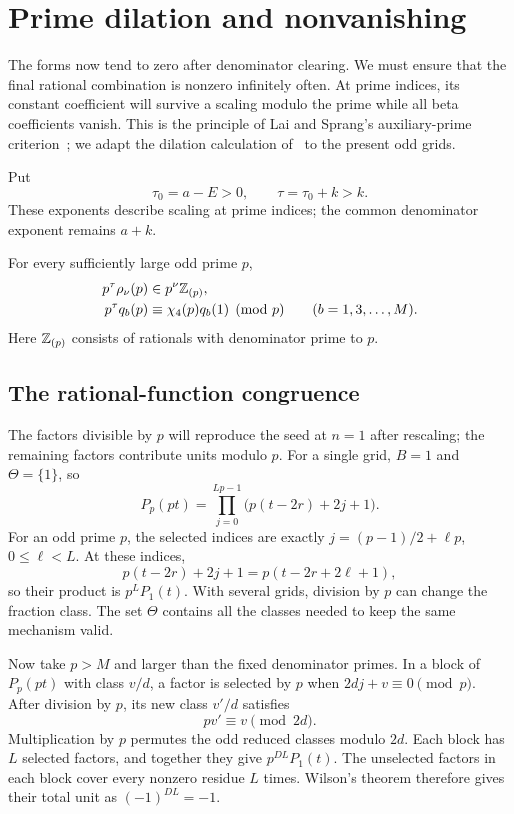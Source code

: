 \section{Prime dilation and nonvanishing}\label{sec:dilation}

The forms now tend to zero after denominator clearing. We must
ensure that the final rational combination is nonzero infinitely
often. At prime indices, its constant coefficient will survive
a scaling modulo the prime while all beta coefficients vanish.
This is the principle of Lai and Sprang's auxiliary-prime
criterion~\cite[Lemma~2.3]{LS25}; we adapt the dilation calculation
of~\cite[Section~6]{Tcount} to the present odd grids.

Put
\[
 \tau_0=a-E>0,\qquad \tau=\tau_0+k>k.
\]
These exponents describe scaling at prime indices; the common
denominator exponent remains $a+k$.

\begin{proposition}\label{prop:dilation}
For every sufficiently large odd prime $p$,
\begin{align}
 p^\tau\rho_\nu(p)&\in p^\nu\mathbb Z_{(p)},\label{eq:rho-dilation}\\
 p^\tau q_b(p)&\equiv\chi_4(p)q_b(1)\pmod p
                    \qquad(b=1,3,\ldots,M).\label{eq:q-dilation}
\end{align}
Here $\mathbb Z_{(p)}$ consists of rationals with denominator prime to $p$.
\end{proposition}

\subsection{The rational-function congruence}

The factors divisible by $p$ will reproduce the seed at $n=1$
after rescaling; the remaining factors contribute units modulo $p$.
For a single grid, $B=1$ and $\Theta=\{1\}$, so
\[
 P_p(pt)=\prod_{j=0}^{Lp-1}\bigl(p(t-2r)+2j+1\bigr).
\]
For an odd prime $p$, the selected indices are exactly
$j=(p-1)/2+\ell p$, $0\le\ell<L$. At these indices,
\[
 p(t-2r)+2j+1=p(t-2r+2\ell+1),
\]
so their product is $p^LP_1(t)$. With several grids, division
by $p$ can change the fraction class. The set $\Theta$ contains
all the classes needed to keep the same mechanism valid.

Now take $p>M$ and larger than the fixed denominator primes.
In a block of $P_p(pt)$ with class $v/d$, a factor is selected
by $p$ when $2dj+v\equiv0\pmod p$. After division by $p$,
its new class $v'/d$ satisfies
\[
 pv'\equiv v\pmod{2d}.
\]
Multiplication by $p$ permutes the odd reduced classes modulo
$2d$. Each block has $L$ selected factors, and together they
give $p^{DL}P_1(t)$. The unselected factors in each block cover
every nonzero residue $L$ times. Wilson's theorem therefore
gives their total unit as $(-1)^{DL}=-1$.

